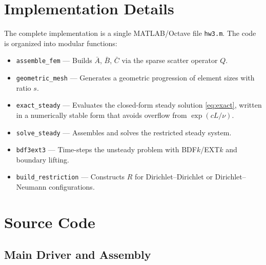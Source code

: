 \documentclass[11pt]{article}
\begin{document}
\section{Implementation Details}

The complete implementation is a single MATLAB/Octave file
\texttt{hw3.m}.  The code is organized into modular functions:

\begin{itemize}[nosep]
  \item \texttt{assemble\_fem} --- Builds $\bar{A}$, $\bar{B}$, $\bar{C}$ via
        the sparse scatter operator $Q$.
  \item \texttt{geometric\_mesh} --- Generates a geometric progression of
        element sizes with ratio $s$.
  \item \texttt{exact\_steady} --- Evaluates the closed-form steady solution
        \eqref{eq:exact}, written in a numerically stable form that avoids
        overflow from $\exp(cL/\nu)$.
  \item \texttt{solve\_steady} --- Assembles and solves the restricted steady
        system.
  \item \texttt{bdf3ext3} --- Time-steps the unsteady problem with
        BDF$k$/EXT$k$ and boundary lifting.
  \item \texttt{build\_restriction} --- Constructs $R$ for
        Dirichlet--Dirichlet or Dirichlet--Neumann configurations.
\end{itemize}


\section{Source Code}

\subsection{Main Driver and Assembly}
\end{document}
